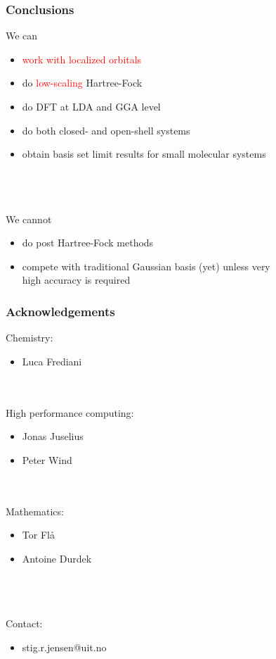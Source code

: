 \documentclass[mathserif]{beamer}
\begin{document}
\begin{frame}
    \frametitle{Conclusions}
    We can
    \begin{itemize}
	\item \textcolor{red}{work with localized orbitals}
	\item do \textcolor{red}{low-scaling} Hartree-Fock
	\item do DFT at LDA and GGA level
	\item do both closed- and open-shell systems
	\item obtain basis set limit results for small molecular systems
    \end{itemize}
    \ \\
    \ \\
    \ \\
    \pause
    We cannot
    \begin{itemize}
	\item do post Hartree-Fock methods
	\item compete with traditional Gaussian basis (yet) unless very \\
		high accuracy is required 
    \end{itemize}
\end{frame}

\begin{frame}
    \frametitle{Acknowledgements}
    Chemistry:
    \begin{itemize}
	\item Luca Frediani
    \end{itemize}
    \ \\
    \ \\
    High performance computing:
    \begin{itemize}
    	\item Jonas Juselius
    	\item Peter Wind
    \end{itemize}
    \ \\
    \ \\
    Mathematics:
    \begin{itemize}
	\item Tor Fl\aa
	\item Antoine Durdek
    \end{itemize}
    \ \\
    \ \\
    \ \\
    Contact:
    \begin{itemize}
	\item stig.r.jensen@uit.no
    \end{itemize}
\end{frame}
\end{document}
